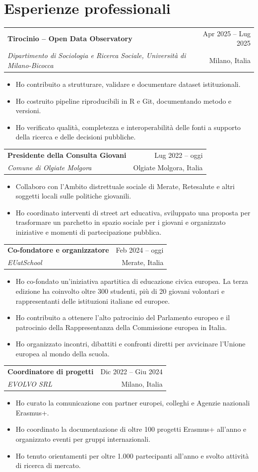 \documentclass[11pt,a4paper]{article}
\makeatletter
\newcommand{\cventry}[4]{%
  \begin{tabularx}{\textwidth}{@{}Xr@{}}
    {\textbf{#1}} & {#4}\\
    {\emph{#2}} & {#3}
  \end{tabularx}\vspace{0.2em}
}
\makeatother
\begin{document}
\section*{Esperienze professionali}

\cventry{Tirocinio -- Open Data Observatory}{Dipartimento di Sociologia e Ricerca Sociale, Università di Milano-Bicocca}{Milano, Italia}{Apr 2025 -- Lug 2025}
\begin{itemize}
  \item Ho contribuito a strutturare, validare e documentare dataset istituzionali.
  \item Ho costruito pipeline riproducibili in R e Git, documentando metodo e versioni.
  \item Ho verificato qualità, completezza e interoperabilità delle fonti a supporto della ricerca e delle decisioni pubbliche.
\end{itemize}

\cventry{Presidente della Consulta Giovani}{Comune di Olgiate Molgora}{Olgiate Molgora, Italia}{Lug 2022 -- oggi}
\begin{itemize}
  \item Collaboro con l'Ambito distrettuale sociale di Merate, Retesalute e altri soggetti locali sulle politiche giovanili.
  \item Ho coordinato interventi di street art educativa, sviluppato una proposta per trasformare un parchetto in spazio sociale per i giovani e organizzato iniziative e momenti di partecipazione pubblica.
\end{itemize}

\cventry{Co-fondatore e organizzatore}{EUatSchool}{Merate, Italia}{Feb 2024 -- oggi}
\begin{itemize}
  \item Ho co-fondato un'iniziativa apartitica di educazione civica europea. La terza edizione ha coinvolto oltre 300 studenti, più di 20 giovani volontari e rappresentanti delle istituzioni italiane ed europee.
  \item Ho contribuito a ottenere l'alto patrocinio del Parlamento europeo e il patrocinio della Rappresentanza della Commissione europea in Italia.
  \item Ho organizzato incontri, dibattiti e confronti diretti per avvicinare l'Unione europea al mondo della scuola.
\end{itemize}

\cventry{Coordinatore di progetti}{EVOLVO SRL}{Milano, Italia}{Dic 2022 -- Giu 2024}
\begin{itemize}
  \item Ho curato la comunicazione con partner europei, colleghi e Agenzie nazionali Erasmus+.
  \item Ho coordinato la documentazione di oltre 100 progetti Erasmus+ all'anno e organizzato eventi per gruppi internazionali.
  \item Ho tenuto orientamenti per oltre 1.000 partecipanti all'anno e svolto attività di ricerca di mercato.
\end{itemize}
\end{document}
